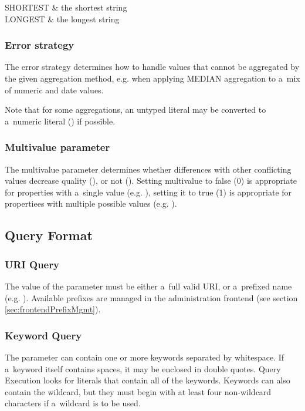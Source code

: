 {\enumtable
{
	SHORTEST & the shortest string \\
	LONGEST & the longest string
}

\subsubsection*{Error strategy}
The error strategy determines how to handle values that cannot be aggregated by the given aggregation method, e.g. when applying MEDIAN aggregation to a~mix of numeric and date values.

Note that for some aggregations, an untyped literal may be converted to a~numeric literal () if possible.

\subsubsection*{Multivalue parameter}
The multivalue parameter determines whether differences with other conflicting values decrease quality (), or not (). Setting multivalue to false (0) is appropriate for properties with a~single value (e.g. ), setting it to true (1) is appropriate for propertiees with multiple possible values (e.g. ).


\subsection{Query Format}

\subsubsection{URI Query}
The value of the  parameter must be either a~full valid URI, or a~prefixed name (e.g. ).  Available prefixes are managed in the administration frontend (see section \ref{sec:frontendPrefixMgmt}).

\subsubsection{Keyword Query}
The  parameter can contain one or more keywords separated by whitespace. If a~keyword itself contains spaces, it may be enclosed in double quotes. Query Execution looks for literals that contain all of the keywords. Keywords can also contain the \code{*} wildcard, but they must begin with at least four non-wildcard characters if a~wildcard is to be used.

}
